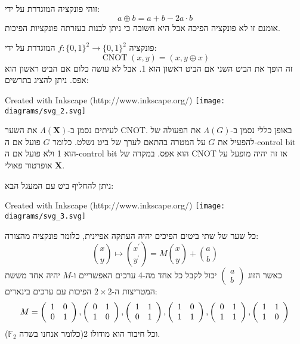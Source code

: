 \documentclass{tstextbook}
\begin{document}
\begin{definition}[XOR]
זוהי פונקציה המוגדרת על ידי:
$$a\oplus b=a+b-2a\cdot b$$
אומנם זו לא פונקציה הפיכה אבל היא חשובה כי ניתן לבנות בעזרתה פונקציות הפיכות.

\end{definition}
\begin{definition}[CNOT]
פונקציה \(f:\{ 0,1 \}^{2}\to\{ 0,1 \}^{2}\) המוגדרת על ידי:
$$\operatorname{CNOT}\left(x,y\right)=\left(x,y\oplus x\right)$$
זה הופך את הביט השני אם הביט ראשון הוא 1. אבל לא עושה כלום אם הביט ראשון הוא אפס. ניתן להציג בתרשים:

 Created with Inkscape (http://www.inkscape.org/) \texttt{[image: diagrams/svg\_2.svg]}
\end{definition}
\begin{symbolize}
לעיתים נסמן ב-\(\Lambda\left( \mathbf{X} \right)\) את השער CNOT. באופן כללי נסמן ב-\(\Lambda(G)\) את הפעולה של להפעיל את \(G\) על המטרה בהתאם לערך של ביט נשלט. כלומר \(G\) פועל אם ה-control bit הוא 1 ולא פועל אם ה-control bit הוא אפס. במקרה של CNOT אז זה יהיה מופעל על אופרטור פאולי \(\mathbf{X}\).

\end{symbolize}
\begin{proposition}
ניתן להחליף ביט עם המעגל הבא:

 Created with Inkscape (http://www.inkscape.org/) \texttt{[image: diagrams/svg\_3.svg]}
\end{proposition}
\begin{proposition}
כל שער של שתי ביטים הפיכים יהיה העתקה אפיינית, כלומר פונקציה מהצורה:
$${\binom{x}{y}}\mapsto{\binom{x^{\prime}}{y^{\prime}}}=M{\binom{x}{y}}+{\binom{a}{b}}$$
כאשר הזוג \(\begin{pmatrix}a\\b\end{pmatrix}\) יכול לקבל כל אחד מה-4 ערכים האפשריים ו-\(M\) יהיה אחד מששת המטריצות ה-\(2\times 2\) הפיכות עם ערכים בינארים:
$$M=\left(\begin{array}{l l}{{1}}&{{0}}\\ {{0}}&{{1}}\end{array}\right),\left(\begin{array}{l l}{{0}}&{{1}}\\ {{1}}&{{0}}\end{array}\right),\left(\begin{array}{l l}{{1}}&{{1}}\\ {{0}}&{{1}}\end{array}\right),\left(\begin{array}{c c}{{1}}&{{0}}\\ {{1}}&{{1}}\end{array}\right),\left(\begin{array}{c c}{{0}}&{{1}}\\ {{1}}&{{1}}\end{array}\right),\left(\begin{array}{c c}{{1}}&{{1}}\\ {{1}}&{{0}}\end{array}\right)$$
וכל חיבור הוא מודולו 2(כלומר אנחנו בשדה \(\mathbb{F} _2\)).

\end{proposition}
\end{document}
